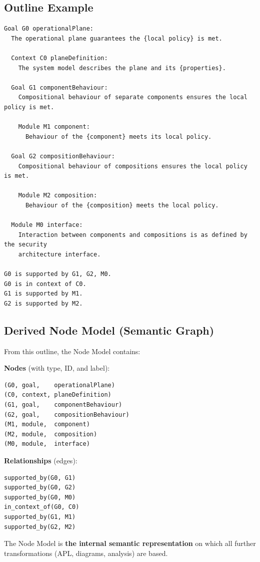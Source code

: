 \documentclass[11pt]{article}
\begin{document}
\subsection{Outline Example}

\begin{verbatim}
Goal G0 operationalPlane:
  The operational plane guarantees the {local policy} is met.

  Context C0 planeDefinition:
    The system model describes the plane and its {properties}.

  Goal G1 componentBehaviour:
    Compositional behaviour of separate components ensures the local policy is met.

    Module M1 component:
      Behaviour of the {component} meets its local policy.

  Goal G2 compositionBehaviour:
    Compositional behaviour of compositions ensures the local policy is met.

    Module M2 composition:
      Behaviour of the {composition} meets the local policy.

  Module M0 interface:
    Interaction between components and compositions is as defined by the security
    architecture interface.

G0 is supported by G1, G2, M0.
G0 is in context of C0.
G1 is supported by M1.
G2 is supported by M2.
\end{verbatim}

\subsection{Derived Node Model (Semantic Graph)}

From this outline, the Node Model contains:

\textbf{Nodes} (with type, ID, and label):
\begin{verbatim}
(G0, goal,    operationalPlane)
(C0, context, planeDefinition)
(G1, goal,    componentBehaviour)
(G2, goal,    compositionBehaviour)
(M1, module,  component)
(M2, module,  composition)
(M0, module,  interface)
\end{verbatim}

\textbf{Relationships} (edges):
\begin{verbatim}
supported_by(G0, G1)
supported_by(G0, G2)
supported_by(G0, M0)
in_context_of(G0, C0)
supported_by(G1, M1)
supported_by(G2, M2)
\end{verbatim}

The Node Model is \textbf{the internal semantic representation} on which all further transformations (APL, diagrams, analysis) are based.
\end{document}
